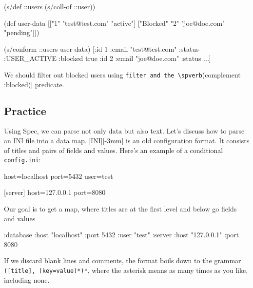 \else

\begin{english}
  \begin{clojure}
(s/def ::users (s/coll-of ::user))

(def user-data
  [["1" "test@test.com" "active"]
   ["Blocked" "2" "joe@doe.com" "pending"]])

(s/conform ::users user-data)
[{:id 1 :email "test@test.com" :status :USER_ACTIVE}
 {:blocked true :id 2 :email "joe@doe.com" :status ...}]
  \end{clojure}
\end{english}

\fi


We should filter out blocked users using \verb|filter and the \spverb|(complement :blocked)| predicate.

\subsection{Practice}


Using Spec, we can parse not only data but also text. Let's discuss how to parse an INI file into a data map.
[INI][-3mm] is an old configuration format. It consists of titles and pairs of fields and values. Here's an example of a conditional  \verb|config.ini|:

\begin{english}
  \begin{ini}
[database]
host=localhost
port=5432
user=test

[server]
host=127.0.0.1
port=8080
  \end{ini}
\end{english}

Our goal is to get a map, where titles are at the first level and below go fields and values

\begin{english}
  \begin{clojure}
{:database {:host "localhost"
            :port 5432
            :user "test"}
 :server {:host "127.0.0.1"
          :port 8080}}
  \end{clojure}
\end{english}

If we discard blank lines and comments, the format boils down to the grammar \verb|([title], (key=value)*)*|, where the asterisk means as many times as you like, including none.

